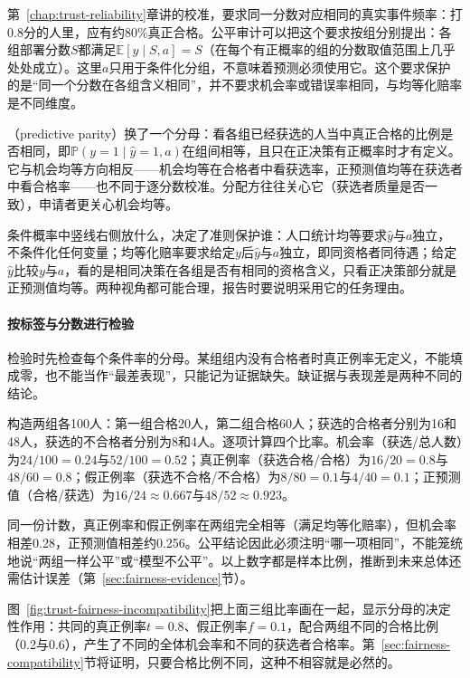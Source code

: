 第~\ref{chap:trust-reliability}章讲的校准，要求同一分数对应相同的真实事件频率：打0.8分的人里，应有约80\%真正合格。公平审计可以把这个要求按组分别提出：各组部署分数$S$都满足$\mathbb E[y\mid S,a]=S$（在每个有正概率的组的分数取值范围上几乎处处成立）。这里$a$只用于条件化分组，不意味着预测必须使用它。这个要求保护的是“同一个分数在各组含义相同”，并不要求机会率或错误率相同，与均等化赔率是不同维度。

（predictive parity）换了一个分母：看各组已经获选的人当中真正合格的比例是否相同，即$\mathbb P(y=1\mid\hat y=1,a)$在组间相等，且只在正决策有正概率时才有定义。它与机会均等方向相反——机会均等在合格者中看获选率，正预测值均等在获选者中看合格率——也不同于逐分数校准。分配方往往关心它（获选者质量是否一致），申请者更关心机会均等。

条件概率中竖线右侧放什么，决定了准则保护谁：人口统计均等要求$\hat y$与$a$独立，不条件化任何变量；均等化赔率要求给定$y$后$\hat y$与$a$独立，即同资格者同待遇；给定$\hat y$比较$y$与$a$，看的是相同决策在各组是否有相同的资格含义，只看正决策部分就是正预测值均等。两种视角都可能合理，报告时要说明采用它的任务理由。

\paragraph{按标签与分数进行检验}

检验时先检查每个条件率的分母。某组组内没有合格者时真正例率无定义，不能填成零，也不能当作“最差表现”，只能记为证据缺失。缺证据与表现差是两种不同的结论。

\begin{example}[同一批申请者上的不同公平指标]
\label{ex:fairness-rates}
构造两组各100人：第一组合格20人，第二组合格60人；获选的合格者分别为16和48人，获选的不合格者分别为8和4人。逐项计算四个比率。机会率（获选/总人数）为$24/100=0.24$与$52/100=0.52$；真正例率（获选合格/合格）为$16/20=0.8$与$48/60=0.8$；假正例率（获选不合格/不合格）为$8/80=0.1$与$4/40=0.1$；正预测值（合格/获选）为$16/24\approx0.667$与$48/52\approx0.923$。

同一份计数，真正例率和假正例率在两组完全相等（满足均等化赔率），但机会率相差0.28，正预测值相差约0.256。公平结论因此必须注明“哪一项相同”，不能笼统地说“两组一样公平”或“模型不公平”。以上数字都是样本比例，推断到未来总体还需估计误差（第~\ref{sec:fairness-evidence}节）。
\end{example}

图~\ref{fig:trust-fairness-incompatibility}把上面三组比率画在一起，显示分母的决定性作用：共同的真正例率$t=0.8$、假正例率$f=0.1$，配合两组不同的合格比例（0.2与0.6），产生了不同的全体机会率和不同的获选者合格率。第~\ref{sec:fairness-compatibility}节将证明，只要合格比例不同，这种不相容就是必然的。

